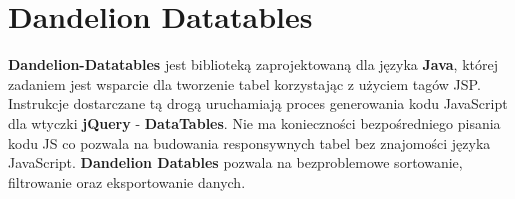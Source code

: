 \section{Dandelion Datatables}\label{tech:dandelion}
	\textbf{Dandelion-Datatables} jest biblioteką zaprojektowaną dla języka \textbf{Java}, której zadaniem jest wsparcie dla tworzenie tabel korzystając z użyciem tagów JSP. Instrukcje dostarczane tą drogą uruchamiają proces generowania kodu JavaScript dla wtyczki \textbf{jQuery} - \textbf{DataTables}. Nie ma konieczności bezpośredniego pisania kodu JS co pozwala na budowania responsywnych tabel bez znajomości języka JavaScript. \textbf{Dandelion Datables} pozwala na bezproblemowe sortowanie, filtrowanie oraz eksportowanie danych. 